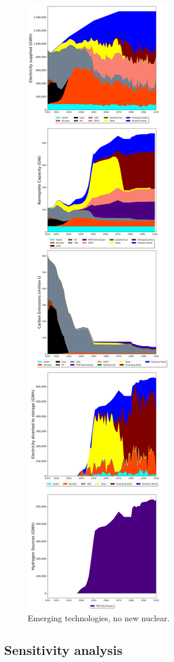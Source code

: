 \begin{figure}[h] 
\centering
\label{scen4}
\includegraphics[scale=0.2]{figures/newtechs_nuc}
\caption{Emerging technologies, no new nuclear.}
\end{figure}

\subsection{Sensitivity analysis}